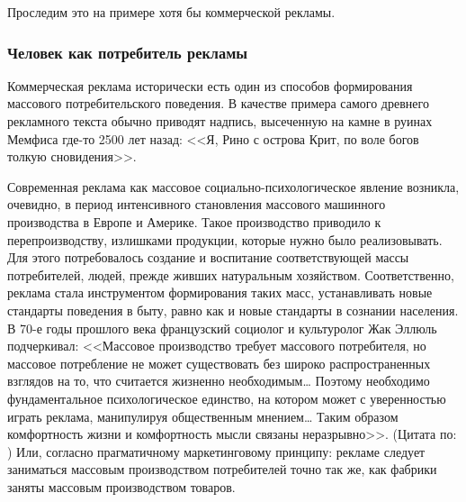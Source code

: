 Проследим это на примере хотя бы коммерческой рекламы.

\subsubsection{Человек как потребитель рекламы}
\label{2.4}

Коммерческая реклама исторически есть один из способов формирования массового
потребительского поведения. В качестве примера самого древнего рекламного текста
обычно приводят надпись, высеченную на камне в руинах Мемфиса где-то 2500 лет
назад: <<Я, Рино с острова Крит, по воле богов толкую сновидения>>\autocite{katernuk2001}.

Современная реклама как массовое социально-психологическое явление возникла,
очевидно, в период интенсивного становления массового машинного производства в
Европе и Америке. Такое производство приводило к перепроизводству, излишками
продукции, которые нужно было реализовывать. Для этого потребовалось создание и
воспитание соответствующей массы потребителей, людей, прежде живших натуральным
хозяйством. Соответственно, реклама стала инструментом формирования таких масс,
устанавливать новые стандарты поведения в быту, равно как и новые стандарты в
сознании населения. В 70-е годы прошлого века французский социолог и культуролог
Жак Эллюль подчеркивал: <<Массовое производство требует массового потребителя,
но массовое потребление не может существовать без широко распространенных взглядов
на то, что считается жизненно необходимым\ldots
Поэтому необходимо фундаментальное психологическое единство, на котором может
с уверенностью играть реклама, манипулируя общественным мнением\ldots
Таким образом комфортность жизни и комфортность мысли связаны неразрывно>>.
(Цитата по: \autocite{golova}) Или, согласно прагматичному маркетинговому принципу:
рекламе следует заниматься массовым производством потребителей точно так же,
как фабрики заняты массовым производством товаров.

